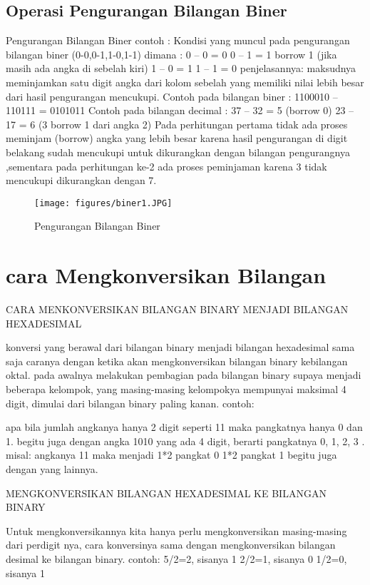 \subsection {Operasi Pengurangan Bilangan Biner}	
	Pengurangan Bilangan Biner
	contoh :
Kondisi yang muncul pada pengurangan bilangan biner (0-0,0-1,1-0,1-1) dimana :
0 – 0 = 0
0 – 1 = 1 borrow 1 (jika masih ada angka di sebelah kiri)
1 – 0 = 1
1 – 1 = 0
penjelasannya: maksudnya meminjamkan satu digit angka dari kolom sebelah yang memiliki nilai lebih besar dari hasil pengurangan mencukupi.
Contoh pada bilangan biner :
1100010 – 110111 = 0101011 
Contoh pada bilangan decimal :
37 – 32 = 5 (borrow 0)
23 – 17 = 6 (3 borrow 1 dari angka 2)
Pada perhitungan pertama tidak ada proses meminjam (borrow) angka yang lebih besar karena hasil pengurangan di digit belakang sudah mencukupi untuk dikurangkan dengan bilangan pengurangnya ,sementara pada perhitungan ke-2 ada proses peminjaman karena 3 tidak mencukupi dikurangkan dengan 7.

\begin{figure}[ht]
\centerline{\texttt{[image: figures/biner1.JPG]}}
\caption{Pengurangan Bilangan Biner}
\label{BilanganBiner}
\end {figure}

\section {cara Mengkonversikan Bilangan}
 CARA MENKONVERSIKAN BILANGAN BINARY MENJADI BILANGAN HEXADESIMAL
 
 konversi yang berawal dari bilangan binary menjadi bilangan hexadesimal sama saja caranya dengan ketika akan mengkonversikan bilangan binary kebilangan oktal. pada awalnya melakukan pembagian pada bilangan binary supaya menjadi beberapa kelompok, yang masing-masing kelompokya mempunyai maksimal 4 digit, dimulai dari bilangan binary paling kanan.
contoh:
 
apa bila jumlah angkanya hanya 2 digit seperti 11 maka pangkatnya hanya 0 dan 1. begitu juga dengan angka 1010 yang ada 4 digit, berarti pangkatnya 0, 1, 2, 3 . 
misal: angkanya 11 maka menjadi
		1*2 pangkat 0
		1*2 pangkat 1
		begitu juga dengan yang lainnya.


MENGKONVERSIKAN BILANGAN HEXADESIMAL KE BILANGAN BINARY

Untuk mengkonversikannya kita hanya perlu mengkonversikan masing-masing dari perdigit nya, cara konversinya sama dengan mengkonversikan bilangan desimal ke bilangan binary.
contoh: 
	5/2=2, sisanya 1
	2/2=1, sisanya 0
	1/2=0, sisanya 1
	
